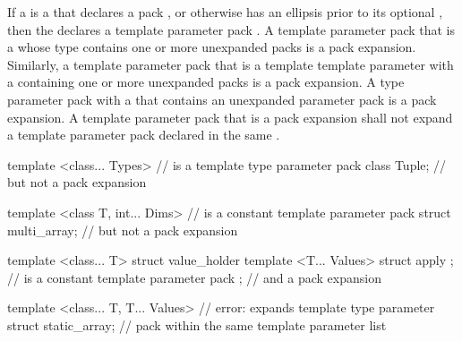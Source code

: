 \documentclass{wg21}
\begin{document}
\pnum
If a  is
a  that declares a pack , or
otherwise has an ellipsis prior to its optional ,
then the 
declares a template parameter pack .
A template parameter pack that is a  whose type
contains one or more unexpanded packs is a pack expansion. Similarly,
a template parameter pack that is a template template parameter with a
 containing one or more unexpanded
packs is a pack expansion.
A type parameter pack with a  that
contains an unexpanded parameter pack is a pack expansion.
A template parameter pack that is a pack
expansion shall not expand a template parameter pack declared in the same
.
\begin{example}
    \begin{codeblock}
        template <class... Types>                       //  is a template type parameter pack
        class Tuple;                                 // but not a pack expansion

        template <class T, int... Dims>                 //  is a constant template parameter pack
        struct multi_array;                          // but not a pack expansion

        template <class... T>
        struct value_holder {
            template <T... Values> struct apply { };    //  is a constant template parameter pack
        };                                            // and a pack expansion

        template <class... T, T... Values>              // error:  expands template type parameter
        struct static_array;                          // pack  within the same template parameter list
    \end{codeblock}
\end{example}
\end{document}
